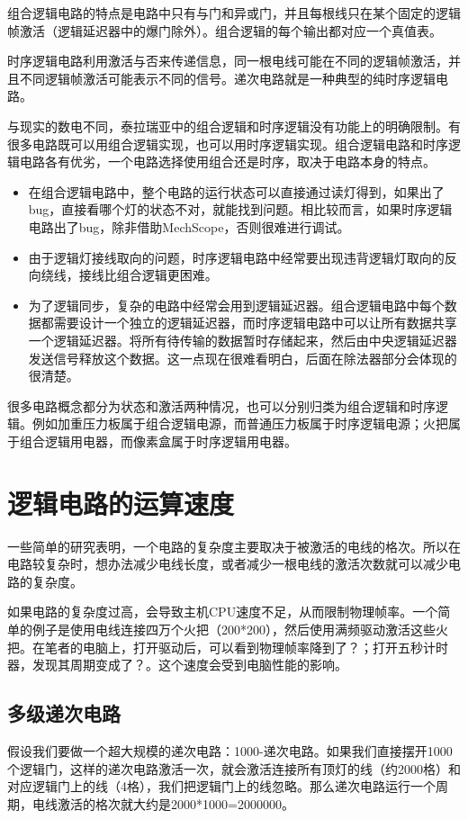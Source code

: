 组合逻辑电路的特点是电路中只有与门和异或门，并且每根线只在某个固定的逻辑帧激活（逻辑延迟器中的爆门除外）。组合逻辑的每个输出都对应一个真值表。

时序逻辑电路利用激活与否来传递信息，同一根电线可能在不同的逻辑帧激活，并且不同逻辑帧激活可能表示不同的信号。递次电路就是一种典型的纯时序逻辑电路。

与现实的数电不同，泰拉瑞亚中的组合逻辑和时序逻辑没有功能上的明确限制。有很多电路既可以用组合逻辑实现，也可以用时序逻辑实现。组合逻辑电路和时序逻辑电路各有优劣，一个电路选择使用组合还是时序，取决于电路本身的特点。
\begin{itemize}
\item 在组合逻辑电路中，整个电路的运行状态可以直接通过读灯得到，如果出了bug，直接看哪个灯的状态不对，就能找到问题。相比较而言，如果时序逻辑电路出了bug，除非借助MechScope，否则很难进行调试。
\item 由于逻辑灯接线取向的问题，时序逻辑电路中经常要出现违背逻辑灯取向的反向绕线，接线比组合逻辑更困难。
\item 为了逻辑同步，复杂的电路中经常会用到逻辑延迟器。组合逻辑电路中每个数据都需要设计一个独立的逻辑延迟器，而时序逻辑电路中可以让所有数据共享一个逻辑延迟器。将所有待传输的数据暂时存储起来，然后由中央逻辑延迟器发送信号释放这个数据。这一点现在很难看明白，后面在除法器部分会体现的很清楚。
\end{itemize}

很多电路概念都分为状态和激活两种情况，也可以分别归类为组合逻辑和时序逻辑。例如加重压力板属于组合逻辑电源，而普通压力板属于时序逻辑电源；火把属于组合逻辑用电器，而像素盒属于时序逻辑用电器。

\section{逻辑电路的运算速度}
一些简单的研究表明，一个电路的复杂度主要取决于被激活的电线的格次。所以在电路较复杂时，想办法减少电线长度，或者减少一根电线的激活次数就可以减少电路的复杂度。

如果电路的复杂度过高，会导致主机CPU速度不足，从而限制物理帧率。一个简单的例子是使用电线连接四万个火把（200*200），然后使用满频驱动激活这些火把。在笔者的电脑上，打开驱动后，可以看到物理帧率降到了？；打开五秒计时器，发现其周期变成了？。这个速度会受到电脑性能的影响。

\subsection{多级递次电路}
假设我们要做一个超大规模的递次电路：1000-递次电路。如果我们直接摆开1000个逻辑门，这样的递次电路激活一次，就会激活连接所有顶灯的线（约2000格）和对应逻辑门上的线（4格），我们把逻辑门上的线忽略。那么递次电路运行一个周期，电线激活的格次就大约是2000*1000=2000000。

